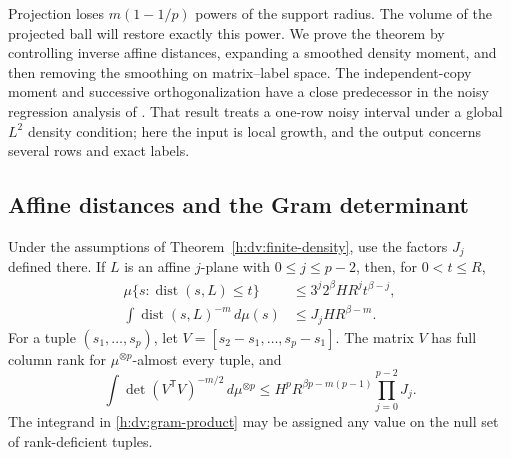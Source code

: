 Projection loses \(m(1-1/p)\) powers of the support radius.
The volume of the projected ball will restore exactly this power.
We prove the theorem by controlling inverse affine distances,
expanding a smoothed density moment, and then removing the smoothing
on matrix--label space. The independent-copy moment and successive
orthogonalization have a close predecessor in the noisy regression
analysis of \cite[Section~7, Lemma~12]{SSV2019}. That result treats a
one-row noisy interval under a global \(L^2\) density condition;
here the input is local growth, and the output concerns several rows
and exact labels.

\subsection{Affine distances and the Gram determinant}

\begin{proposition}
\label{h:dv:ambient-gram}
Under the assumptions of Theorem~\ref{h:dv:finite-density}, use
the factors \(J_j\) defined there.
If \(L\) is an affine \(j\)-plane with \(0\le j\le p-2\), then,
for \(0<t\le R\),
\begin{align}
 \mu\{s:\operatorname{dist}(s,L)\le t\}
 &\le 3^j2^\beta H R^j t^{\beta-j},
 \label{h:dv:tube}\\
 \int\operatorname{dist}(s,L)^{-m}\,d\mu(s)
 &\le J_j H R^{\beta-m}.
 \label{h:dv:inverse-distance}
\end{align}
For a tuple \((s_1,\ldots,s_p)\), let
\(V=[s_2-s_1,\ldots,s_p-s_1]\).  The matrix \(V\) has full column rank
for \(\mu^{\otimes p}\)-almost every tuple, and
\begin{equation}
 \int\det(V^{\mathsf T}V)^{-m/2}\,d\mu^{\otimes p}
 \le
 H^p R^{\beta p-m(p-1)}
 \prod_{j=0}^{p-2}J_j.
 \label{h:dv:gram-product}
\end{equation}
The integrand in \eqref{h:dv:gram-product} may be assigned any value on
the null set of rank-deficient tuples.

\end{proposition}

